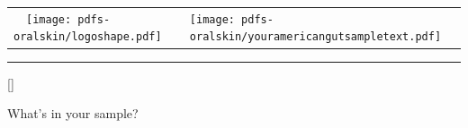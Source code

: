 \documentclass[landscape]{article}
\begin{document}
\begin{tabular}{ m{4.4cm} m{16cm} }  %
	~~\texttt{[image: pdfs-oralskin/logoshape.pdf]} & \texttt{[image: pdfs-oralskin/youramericangutsampletext.pdf]} \\
\end{tabular}

\hrule

\vspace{0.65cm}


\begin{center}

\StrLen{\yourname}[\yournameLen]


\end{center}

\vspace{0.65cm}


{\huge What's in your \sampletype{} sample?}

\vspace{2mm}
\end{document}
